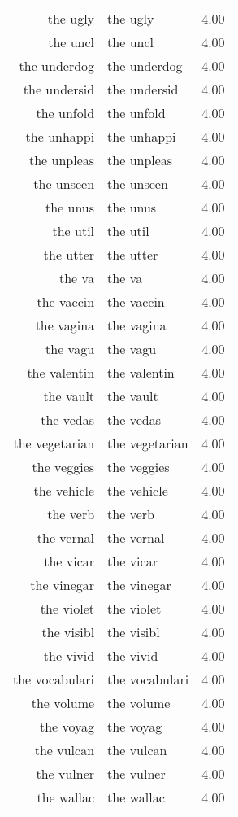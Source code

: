 \begin{table}[ht]
\begin{tabular}{rlr}
  the ugly & the ugly & 4.00 \\ 
  the uncl & the uncl & 4.00 \\ 
  the underdog & the underdog & 4.00 \\ 
  the undersid & the undersid & 4.00 \\ 
  the unfold & the unfold & 4.00 \\ 
  the unhappi & the unhappi & 4.00 \\ 
  the unpleas & the unpleas & 4.00 \\ 
  the unseen & the unseen & 4.00 \\ 
  the unus & the unus & 4.00 \\ 
  the util & the util & 4.00 \\ 
  the utter & the utter & 4.00 \\ 
  the va & the va & 4.00 \\ 
  the vaccin & the vaccin & 4.00 \\ 
  the vagina & the vagina & 4.00 \\ 
  the vagu & the vagu & 4.00 \\ 
  the valentin & the valentin & 4.00 \\ 
  the vault & the vault & 4.00 \\ 
  the vedas & the vedas & 4.00 \\ 
  the vegetarian & the vegetarian & 4.00 \\ 
  the veggies & the veggies & 4.00 \\ 
  the vehicle & the vehicle & 4.00 \\ 
  the verb & the verb & 4.00 \\ 
  the vernal & the vernal & 4.00 \\ 
  the vicar & the vicar & 4.00 \\ 
  the vinegar & the vinegar & 4.00 \\ 
  the violet & the violet & 4.00 \\ 
  the visibl & the visibl & 4.00 \\ 
  the vivid & the vivid & 4.00 \\ 
  the vocabulari & the vocabulari & 4.00 \\ 
  the volume & the volume & 4.00 \\ 
  the voyag & the voyag & 4.00 \\ 
  the vulcan & the vulcan & 4.00 \\ 
  the vulner & the vulner & 4.00 \\ 
  the wallac & the wallac & 4.00 \\ 

\end{tabular}
\end{table}

